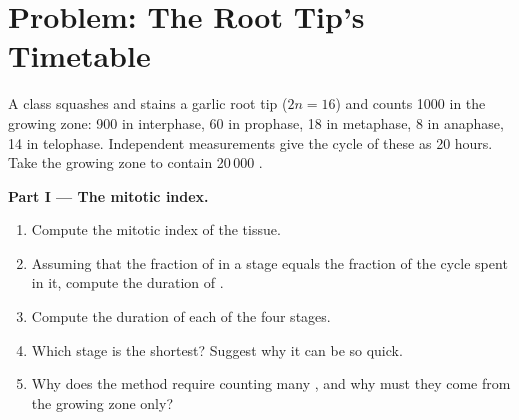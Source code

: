 \section{Problem: The Root Tip's Timetable}

\begin{problem}
\label{pb:g11:cell-cycle-mitosis:1}
A class squashes and stains a garlic root tip ($2n = 16$) and counts
1000  in the growing zone: 900 in interphase, 60 in prophase, 18
in metaphase, 8 in anaphase, 14 in telophase. Independent measurements
give the cycle of these  as 20 hours. Take the growing zone to
contain 20\,000 .

\medskip
\noindent\textbf{Part I --- The mitotic index.}
\begin{enumerate}
  \item Compute the mitotic index of the tissue.
  \item Assuming that the fraction of  in a stage equals the
        fraction of the cycle spent in it, compute the duration of
        .
  \item Compute the duration of each of the four stages.
  \item Which stage is the shortest? Suggest why it can be so quick.
  \item Why does the method require counting many , and why must
        they come from the growing zone only?
\end{enumerate}


\end{problem}
